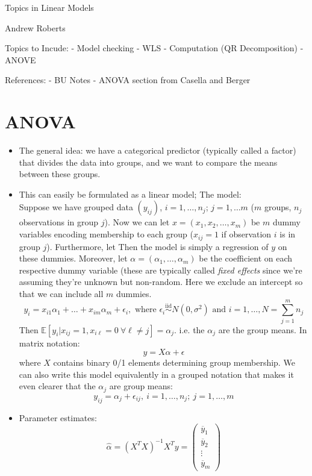 \documentclass[12pt]{article}
\newcommand{\E}{\mathbb{E}}
\begin{document}
\begin{center}
\Large
Topics in Linear Models
\end{center}

\begin{flushright}
Andrew Roberts
\end{flushright} 


Topics to Incude: 
- Model checking
- WLS
- Computation (QR Decomposition)
- ANOVE 

References: 
- BU Notes
- ANOVA section from Casella and Berger

\section{ANOVA}
	\begin{itemize} 
	\item The general idea: we have a categorical predictor (typically called a factor) that divides the data into groups, and we want to compare the means between these groups. 
	\item This can easily be formulated as a linear model; The model: \\[.2cm]
	Suppose we have grouped data $(y_{ij})$, $i = 1, \dots, n_j$; $j = 1, \dots m$ ($m$ groups, $n_j$ observations in group $j$). Now we can let $x = (x_1, x_2, \dots, x_m)$
	be $m$ dummy variables encoding membership to each group ($x_{ij} = 1$ if observation $i$ is in group $j$). Furthermore, let Then the model is simply a regression of 
	$y$ on these dummies. Moreover, let $\alpha = (\alpha_1, \dots, \alpha_m)$ be the coefficient on each respective dummy variable (these are typically called
	\textit{fixed effects} since we're assuming they're unknown but non-random. Here we exclude an intercept so that we can include all $m$ dummies. 
	\[y_i = x_{i1}\alpha_1 + \dots + x_{im}\alpha_m + \epsilon_{i}, \text{ where } \epsilon_i \stackrel{\text{iid}}{\sim} N(0, \sigma^2) \text{ and } i = 1, \dots, N = \sum_{j = 1}^{m} n_j\]
	Then $\E[y_i|x_{ij} = 1, x_{i\ell} = 0 \ \forall \ell \neq j] = \alpha_j$. i.e. the $\alpha_j$ are the group means. In matrix notation: 
	\[y = X\alpha + \epsilon\]
	where $X$ contains binary 0/1 elements determining group membership. We can also write this model equivalently in a grouped notation that makes it even clearer that the $\alpha_j$ are group means: 
	\[y_{ij} = \alpha_j + \epsilon_{ij}, \ i = 1, \dots, n_j; \ j = 1, \dots, m\]
	\item Parameter estimates: 
	\[\hat{\alpha} = (X^T X)^{-1}X^T y = \begin{pmatrix} \overline{y}_1 \\ \overline{y}_2 \\ \vdots \\ \overline{y}_m\end{pmatrix} \]

\end{itemize}
\end{document}
